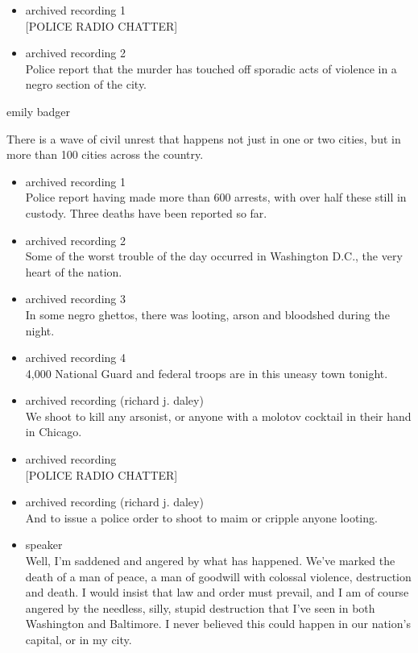 \begin{itemize}
\item
  archived recording 1\\
  {[}POLICE RADIO CHATTER{]}
\item
  archived recording 2\\
  Police report that the murder has touched off sporadic acts of
  violence in a negro section of the city.
\end{itemize}

emily badger

There is a wave of civil unrest that happens not just in one or two
cities, but in more than 100 cities across the country.

\begin{itemize}
\item
  archived recording 1\\
  Police report having made more than 600 arrests, with over half these
  still in custody. Three deaths have been reported so far.
\item
  archived recording 2\\
  Some of the worst trouble of the day occurred in Washington D.C., the
  very heart of the nation.
\item
  archived recording 3\\
  In some negro ghettos, there was looting, arson and bloodshed during
  the night.
\item
  archived recording 4\\
  4,000 National Guard and federal troops are in this uneasy town
  tonight.
\item
  archived recording (richard j. daley)\\
  We shoot to kill any arsonist, or anyone with a molotov cocktail in
  their hand in Chicago.
\item
  archived recording\\
  {[}POLICE RADIO CHATTER{]}
\item
  archived recording (richard j. daley)\\
  And to issue a police order to shoot to maim or cripple anyone
  looting.
\item
  speaker\\
  Well, I'm saddened and angered by what has happened. We've marked the
  death of a man of peace, a man of goodwill with colossal violence,
  destruction and death. I would insist that law and order must prevail,
  and I am of course angered by the needless, silly, stupid destruction
  that I've seen in both Washington and Baltimore. I never believed this
  could happen in our nation's capital, or in my city.
\end{itemize}

